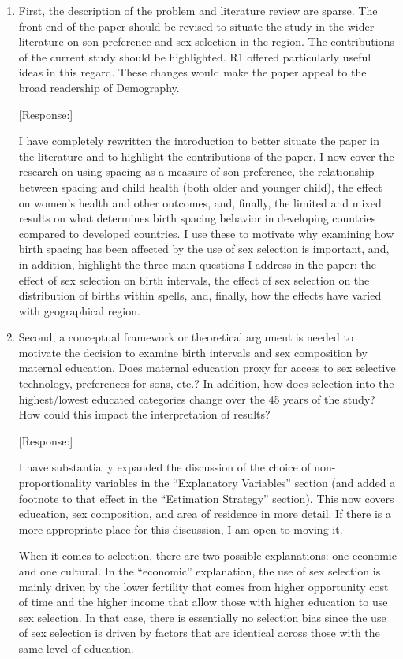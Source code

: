 \documentclass[letterpaper,12pt]{article}
\begin{document}
\begin{enumerate}

\item First, the description of the problem and literature review are sparse.
The front end of the paper should be revised to situate the study in the
wider literature on son preference and sex selection in the region. The
contributions of the current study should be highlighted. R1 offered
particularly useful ideas in this regard. These changes would make the
paper appeal to the broad readership of Demography.

[Response:]

I have completely rewritten the introduction to better situate the paper in the literature
and to highlight the contributions of the paper.
I now cover the research on using spacing as a measure of son preference, the 
relationship between spacing and child health (both older and younger child), the 
effect on women's health and other outcomes, and, finally, the limited and mixed results
on what determines birth spacing behavior in developing countries compared to developed 
countries.
I use these to motivate why examining how birth spacing has been affected by the use of
sex selection is important, and, in addition, highlight the three main questions I address 
in the paper: the effect of sex selection on birth intervals, the effect of sex selection
on the distribution of births within spells, and, finally, how the effects have varied
with geographical region.


\item Second, a conceptual framework or theoretical argument is needed to
motivate the decision to examine birth intervals and sex composition by
maternal education. Does maternal education proxy for access to sex
selective technology, preferences for sons, etc.? 
In addition, how does
selection into the highest/lowest educated categories change over the 45
years of the study? How could this impact the interpretation of results?

[Response:]

I have substantially expanded the discussion of the choice of non-proportionality 
variables in the ``Explanatory Variables'' section (and added a footnote to that effect 
in the ``Estimation Strategy'' section).
This now covers education, sex composition, and area of residence in more detail.
If there is a more appropriate place for this discussion, I am open to moving it.

When it comes to selection, there are two possible explanations: one economic and one 
cultural.
In the ``economic'' explanation, the use of sex selection is mainly driven by the lower 
fertility that comes from higher opportunity cost of time and the higher income that allow 
those with higher education to use sex selection.
In that case, there is essentially no selection bias since the use of sex selection is 
driven by factors that are identical across those with the same level of education.


\end{enumerate}
\end{document}
